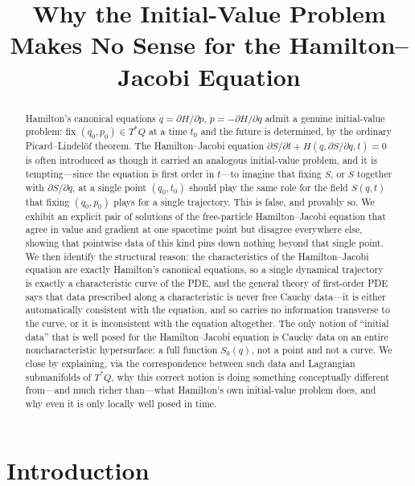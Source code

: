 \documentclass[11pt]{article}
\title{Why the Initial-Value Problem Makes No Sense for the Hamilton--Jacobi Equation}
\author{}
\date{}
\begin{document}
\maketitle

\begin{abstract}
\noindent
Hamilton's canonical equations $\dot q=\partial H/\partial p$, $\dot p=-\partial H/\partial q$ admit a genuine initial-value problem: fix $(q_0,p_0)\in T^*Q$ at a time $t_0$ and the future is determined, by the ordinary Picard--Lindel\"of theorem. The Hamilton--Jacobi equation $\partial S/\partial t + H(q,\partial S/\partial q,t)=0$ is often introduced as though it carried an analogous initial-value problem, and it is tempting---since the equation is first order in $t$---to imagine that fixing $S$, or $S$ together with $\partial S/\partial q$, at a single point $(q_0,t_0)$ should play the same role for the field $S(q,t)$ that fixing $(q_0,p_0)$ plays for a single trajectory. This is false, and provably so. We exhibit an explicit pair of solutions of the free-particle Hamilton--Jacobi equation that agree in value and gradient at one spacetime point but disagree everywhere else, showing that pointwise data of this kind pins down nothing beyond that single point. We then identify the structural reason: the characteristics of the Hamilton--Jacobi equation are exactly Hamilton's canonical equations, so a single dynamical trajectory is exactly a characteristic curve of the PDE, and the general theory of first-order PDE says that data prescribed along a characteristic is never free Cauchy data---it is either automatically consistent with the equation, and so carries no information transverse to the curve, or it is inconsistent with the equation altogether. The only notion of ``initial data'' that is well posed for the Hamilton--Jacobi equation is Cauchy data on an entire noncharacteristic hypersurface: a full function $S_0(q)$, not a point and not a curve. We close by explaining, via the correspondence between such data and Lagrangian submanifolds of $T^*Q$, why this correct notion is doing something conceptually different from---and much richer than---what Hamilton's own initial-value problem does, and why even it is only locally well posed in time.
\end{abstract}

\section{Introduction}
\label{sec:intro}
\end{document}
